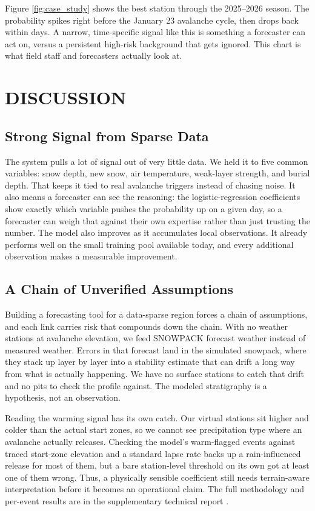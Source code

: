 \documentclass{issw}
\begin{document}
Figure \ref{fig:case_study} shows the best station through the 2025–2026 season. The probability spikes right before the January 23 avalanche cycle, then drops back within days. A narrow, time-specific signal like this is something a forecaster can act on, versus a persistent high-risk background that gets ignored. This chart is what field staff and forecasters actually look at.

\section{DISCUSSION}
\subsection{Strong Signal from Sparse Data}
The system pulls a lot of signal out of very little data. We held it to five common variables: snow depth, new snow, air temperature, weak-layer strength, and burial depth. That keeps it tied to real avalanche triggers instead of chasing noise. It also means a forecaster can see the reasoning: the logistic-regression coefficients show exactly which variable pushes the probability up on a given day, so a forecaster can weigh that against their own expertise rather than just trusting the number.
The model also improves as it accumulates local observations. It already performs well on the small training pool available today, and every additional observation makes a measurable improvement.

\subsection{A Chain of Unverified Assumptions}
Building a forecasting tool for a data-sparse region forces a chain of assumptions, and each link carries risk that compounds down the chain. With no weather stations at avalanche elevation, we feed SNOWPACK forecast weather instead of measured weather. Errors in that forecast land in the simulated snowpack, where they stack up layer by layer into a stability estimate that can drift a long way from what is actually happening. We have no surface stations to catch that drift and no pits to check the profile against. The modeled stratigraphy is a hypothesis, not an observation.

Reading the warming signal has its own catch. Our virtual stations sit higher and colder than the actual start zones, so we cannot see precipitation type where an avalanche actually releases. Checking the model's warm-flagged events against traced start-zone elevation and a standard lapse rate backs up a rain-influenced release for most of them, but a bare station-level threshold on its own got at least one of them wrong. Thus, a physically sensible coefficient still needs terrain-aware interpretation before it becomes an operational claim. The full methodology and per-event results are in the supplementary technical report \parencite{ShelegEtAl2026}.
\end{document}
